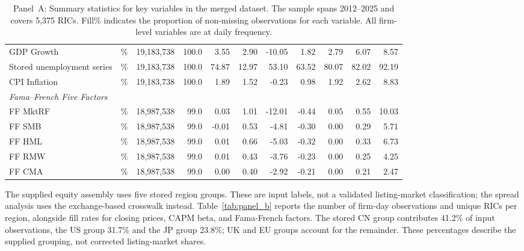 \documentclass{article}
\theoremstyle{plain}
\begin{document}
\begin{table}
\begin{tabular}{l l r r r r r r r r r}
  GDP Growth & \% & 19,183,738 & 100.0 & 3.55 & 2.90 & -10.05 & 1.82 & 2.79 & 6.07 & 8.57 \\
  Stored unemployment series & \% & 19,183,738 & 100.0 & 74.87 & 12.97 & 53.10 & 63.52 & 80.07 & 82.02 & 92.19 \\
  CPI Inflation & \% & 19,183,738 & 100.0 & 1.89 & 1.52 & -0.23 & 0.98 & 1.92 & 2.62 & 8.83 \\
\midrule
\multicolumn{11}{l}{\textit{Fama--French Five Factors}} \\
  FF MktRF & \% & 18,987,538 & 99.0 & 0.03 & 1.01 & -12.01 & -0.44 & 0.05 & 0.55 & 10.03 \\
  FF SMB & \% & 18,987,538 & 99.0 & -0.01 & 0.53 & -4.81 & -0.30 & 0.00 & 0.29 & 5.71 \\
  FF HML & \% & 18,987,538 & 99.0 & 0.01 & 0.66 & -5.03 & -0.32 & 0.00 & 0.33 & 6.73 \\
  FF RMW & \% & 18,987,538 & 99.0 & 0.01 & 0.43 & -3.76 & -0.23 & 0.00 & 0.25 & 4.25 \\
  FF CMA & \% & 18,987,538 & 99.0 & 0.00 & 0.40 & -2.92 & -0.21 & 0.00 & 0.21 & 2.47 \\
\bottomrule
\end{tabular}
\caption{Panel~A: Summary statistics for key variables in the merged dataset. The sample spans 2012--2025 and covers 5,375 RICs. Fill\% indicates the proportion of non-missing observations for each variable. All firm-level variables are at daily frequency.}
\label{tab:panel_a}
\end{table}

The supplied equity assembly uses five stored region groups. These are input labels, not a validated listing-market classification; the spread analysis uses the exchange-based crosswalk instead. Table~\ref{tab:panel_b} reports the number of firm-day observations and unique RICs per region, alongside fill rates for closing prices, CAPM beta, and Fama-French factors. The stored CN group contributes 41.2\% of input observations, the US group 31.7\% and the JP group 23.8\%; UK and EU groups account for the remainder. These percentages describe the supplied grouping, not corrected listing-market shares.
\end{document}
